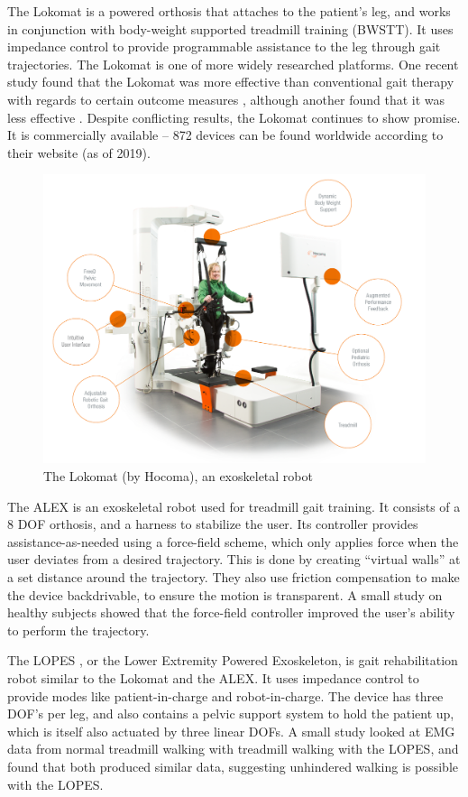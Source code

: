 \documentclass[12pt]{report}
\begin{document}
	The Lokomat is a powered orthosis that attaches to the patient's leg, and works in conjunction with body-weight supported treadmill training (BWSTT). It uses impedance control to provide programmable assistance to the leg through gait trajectories. The Lokomat is one of more widely researched platforms. One recent study found that the Lokomat was more effective than conventional gait therapy with regards to certain outcome measures \cite{Nam2017}, although another found that it was less effective \cite{Hidler2008}. Despite conflicting results, the Lokomat continues to show promise. It is commercially available -- 872 devices can be found worldwide according to their website (as of 2019).
			
	\begin{figure}[h] 
		\centering
		\includegraphics[width=0.75\linewidth]{Lokomat}
		\caption{The Lokomat (by Hocoma), an exoskeletal robot}
		\label{fig:Lokomat}
	\end{figure}
	
	The ALEX \cite{Banala2007} is an exoskeletal robot used for treadmill gait training. It consists of a 8 DOF orthosis, and a harness to stabilize the user. Its controller provides assistance-as-needed using a force-field scheme, which only applies force when the user deviates from a desired trajectory. This is done by creating ``virtual walls'' at a set distance around the trajectory. They also use friction compensation to make the device backdrivable, to ensure the motion is transparent. A small study on healthy subjects showed that the force-field controller improved the user's ability to perform the trajectory. 
	
	The LOPES \cite{Veneman2007}, or the Lower Extremity Powered Exoskeleton, is gait rehabilitation robot similar to the Lokomat and the ALEX. It uses impedance control to provide modes like patient-in-charge and robot-in-charge. The device has three DOF's per leg, and also contains a pelvic support system to hold the patient up, which is itself also actuated by three linear DOFs. A small study looked at EMG data from normal treadmill walking with treadmill walking with the LOPES, and found that both produced similar data, suggesting unhindered walking is possible with the LOPES.
	
\end{document}
